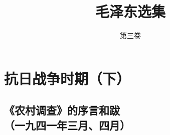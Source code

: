 \documentclass[cn,11pt,chinese]{elegantbook}
\title{毛泽东选集}
\subtitle{第三卷}
\def\myformat#1{\hfil\hfil #1}
\begin{document}
\maketitle
\frontmatter

\iffalse
\chapter*{特别声明}
\markboth{Introduction}{前言}

在过去的 2019 年，\href{https://elegantlatex.org/}{Elegant\LaTeX{}} 系列模板均逐步上线 \href{https://github.com/ElegantLaTeX}{GitHub}、\href{https://ctan.org/pkg/elegantbook}{CTAN}、\href{https://www.overleaf.com/latex/templates/elegantbook-template/zpsrbmdsxrgy}{Overleaf} 以及 \href{https://gitee.com/ElegantLaTeX/ElegantBook}{Gitee} 上。截止到 2019 年底，ElegantNote、ElegantBook、ElegantPaper 三个模板在 GitHub 上的收藏数达到了 194、333 和 220，从 2019 年 5 月开启捐赠之后收到了用户 33 笔合计超过 1500 元的捐赠，用户群人数也超过了 400 人。这些数字的背后，反映出 Elegant\LaTeX{} 越来越受用户的喜爱，在此非常感谢大家。

但是，我想声明的是：

\begin{center}
  由于某些原因，Elegant\LaTeX{} 项目 \underline{不再接受}\textbf{任何}非我本人预约的提交。
\end{center}

我是一个理想主义者，关于这个模板，我有自己的想法。我所关心的是，我周围的人能方便使用 \LaTeX{} 以及此模板，我自己会为自己的东西感到开心。如果维护模板让我不开心，那我就不会再维护了。诚然这个模板并不是完美的，但是相比 2.x 好很多了，这些改进离不开大家的反馈、China\TeX{} 和逐鹿人的鼓励以及支援人员的帮助！

\underline{如果你无法认同我的想法，建议直接删除本模板。}

\vskip 1.5cm

\begin{flushright}
Ethan Deng\\
February 10, 2020
\end{flushright}
\fi


\tableofcontents

\mainmatter


\chapter*{抗日战争时期（下）}\newpage\section*{\myformat{《农村调查》的序言和跋}\\\myformat{（一九四一年三月、四月）}}
\end{document}
